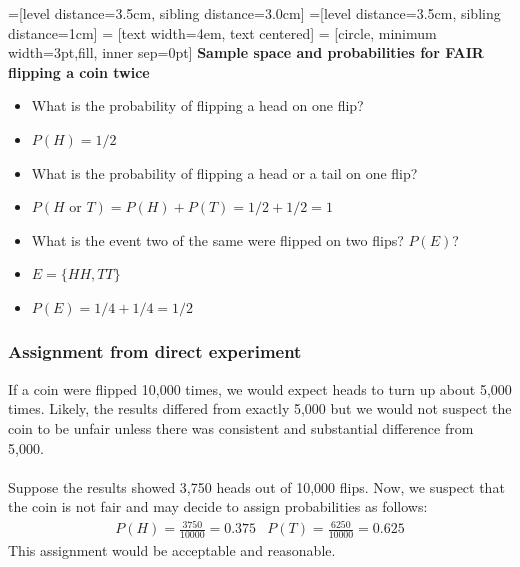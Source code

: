 \documentclass[14pt]{extarticle}
\begin{document}
=[level distance=3.5cm, sibling distance=3.0cm]
=[level distance=3.5cm, sibling distance=1cm]
 = [text width=4em, text centered]
 = [circle, minimum width=3pt,fill, inner sep=0pt]
\textbf{Sample space and probabilities for FAIR flipping a coin twice}\\
\begin{itemize}
	\item What is the probability of flipping a head on one flip?
	\item $P(H) = 1/2$
	\item What is the probability of flipping a head or a tail on one flip?
	\item $P(H \text{ or } T) = P(H) + P(T) = 1/2+1/2 = 1$
	\item What is the event two of the same were flipped on two flips? $P(E)$?
	\item $E = \{HH, TT\}$
	\item $P(E) = 1/4 + 1/4 = 1/2$
\end{itemize}

\subsubsection*{Assignment from direct experiment}
If a coin were flipped 10,000 times, we would expect heads to turn up about 5,000 times. Likely, the results differed from exactly 5,000 but we would not suspect the coin to be unfair unless there was consistent and substantial difference from 5,000.
\\\\ 
Suppose the results showed 3,750 heads out of 10,000 flips. Now, we suspect that the coin is not fair and may decide to assign probabilities as follows:
\begin{align*}
	&P(H) = \frac{3750}{10000}=0.375 & P(T) = \frac{6250}{10000} =0.625&
\end{align*}
This assignment would be acceptable and reasonable. 
\end{document}
